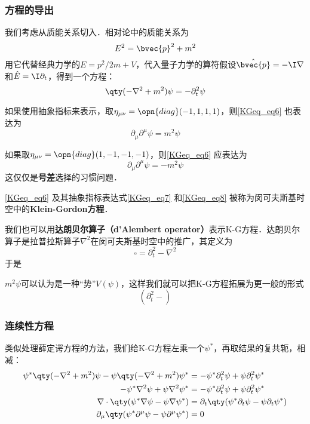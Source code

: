 \subsubsection{方程的导出}

我们考虑从质能关系切入．相对论中的质能关系为
\begin{equation}
E^2=\bvec{p}^2+m^2
\end{equation}
用它代替经典力学的$E=p^2/2m+V$，代入量子力学的算符假设$\hat{\bvec{p}}=-\I\nabla$和$\hat{E}=\I\partial_t$，得到一个方程：
\begin{equation}\label{KGeq_eq6}
\qty(-\nabla^2+m^2)\psi = -\partial_t^2 \psi
\end{equation}

如果使用抽象指标来表示，取$\eta_{\mu\nu}=\opn{diag}(-1, 1, 1, 1)$，则\autoref{KGeq_eq6} 也表达为
\begin{equation}\label{KGeq_eq7}
\partial_\mu\partial^\mu \psi = m^2\psi
\end{equation}

如果取$\eta_{\mu\nu}=\opn{diag}(1, -1, -1, -1)$，则\autoref{KGeq_eq6} 应表达为
\begin{equation}\label{KGeq_eq8}
\partial_\mu\partial^\mu \psi = -m^2\psi
\end{equation}
这仅仅是\textbf{号差}选择的习惯问题．

\autoref{KGeq_eq6} 及其抽象指标表达式\autoref{KGeq_eq7} 和\autoref{KGeq_eq8} 被称为闵可夫斯基时空中的\textbf{Klein-Gordon方程}．

我们也可以用\textbf{达朗贝尔算子（d'Alembert operator）}表示K-G方程．达朗贝尔算子是拉普拉斯算子$\nabla^2$在闵可夫斯基时空中的推广，其定义为
\begin{equation}
\square = \partial_t^2-\nabla^2
\end{equation}
于是



$m^2\psi$可以认为是一种“势”$V(\psi)$，这样我们就可以把K-G方程拓展为更一般的形式
\begin{equation}
(\partial_t^2-)
\end{equation}







\subsubsection{连续性方程}

类似处理薛定谔方程的方法，我们给K-G方程左乘一个$\psi^*$，再取结果的复共轭，相减：
\begin{equation}\label{KGeq_eq9}
\begin{aligned}
\psi^*\qty(-\nabla^2+m^2)\psi-\psi\qty(-\nabla^2+m^2)\psi^* &= -\psi^*\partial_t^2 \psi+\psi\partial_t^2 \psi^*\\
-\psi^*\nabla^2\psi+\psi\nabla^2\psi^* &= -\psi^*\partial_t^2\psi+\psi\partial_t^2\psi^*\\
\nabla\cdot\qty(\psi^*\nabla\psi-\psi\nabla\psi^*) &= \partial_t\qty(\psi^*\partial_t\psi-\psi\partial_t\psi^*)\\
\partial_\mu\qty(\psi^*\partial^\mu\psi-\psi\partial^\mu\psi^*) & =0
\end{aligned}
\end{equation}

